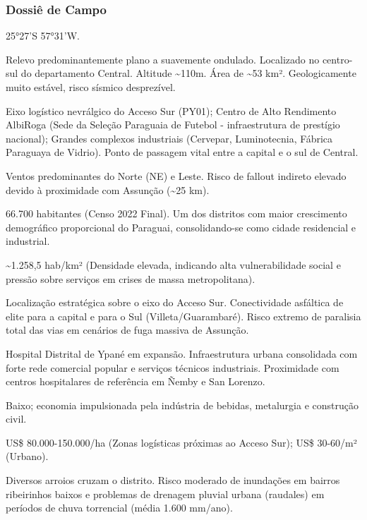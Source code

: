 \subsubsection{Dossiê de Campo}
\begin{description}[style=nextline,leftmargin=0.5cm,font=\bfseries]
\item[Coordenadas]  25°27'S 57°31'W.
\item[Topografia]  Relevo predominantemente plano a suavemente ondulado. Localizado no centro-sul do departamento Central. Altitude \textasciitilde 110m. Área de \textasciitilde 53 km². Geologicamente muito estável, risco sísmico desprezível.
\item[Alvos Estratégicos]  Eixo logístico nevrálgico do Acceso Sur (PY01); Centro de Alto Rendimento AlbiRoga (Sede da Seleção Paraguaia de Futebol - infraestrutura de prestígio nacional); Grandes complexos industriais (Cervepar, Luminotecnia, Fábrica Paraguaya de Vidrio). Ponto de passagem vital entre a capital e o sul de Central.
\item[Fallout]  Ventos predominantes do Norte (NE) e Leste. Risco de fallout indireto elevado devido à proximidade com Assunção (\textasciitilde 25 km).
\item[População]  66.700 habitantes (Censo 2022 Final). Um dos distritos com maior crescimento demográfico proporcional do Paraguai, consolidando-se como cidade residencial e industrial.
\item[Densidade]  \textasciitilde 1.258,5 hab/\allowbreak km² (Densidade elevada, indicando alta vulnerabilidade social e pressão sobre serviços em crises de massa metropolitana).
\item[Vias de Acesso]  Localização estratégica sobre o eixo do Acceso Sur. Conectividade asfáltica de elite para a capital e para o Sul (Villeta/\allowbreak Guarambaré). Risco extremo de paralisia total das vias em cenários de fuga massiva de Assunção.
\item[Serviços]  Hospital Distrital de Ypané em expansão. Infraestrutura urbana consolidada com forte rede comercial popular e serviços técnicos industriais. Proximidade com centros hospitalares de referência em Ñemby e San Lorenzo.
\item[Custo de Vida]  Baixo; economia impulsionada pela indústria de bebidas, metalurgia e construção civil.
\item[Preço da Terra]  US\$ 80.000-150.000/\allowbreak ha (Zonas logísticas próximas ao Acceso Sur); US\$ 30-60/\allowbreak m² (Urbano).
\item[Hidrologia]  Diversos arroios cruzam o distrito. Risco moderado de inundações em bairros ribeirinhos baixos e problemas de drenagem pluvial urbana (raudales) em períodos de chuva torrencial (média 1.600 mm/\allowbreak ano).

\end{description}
